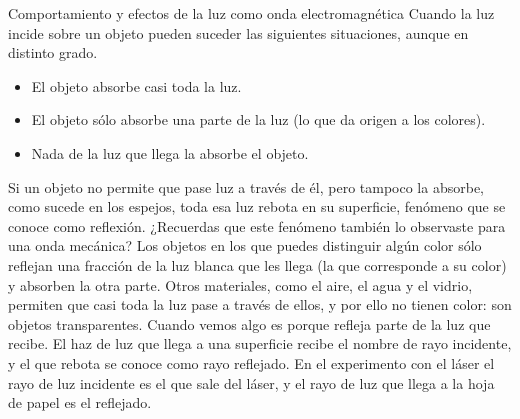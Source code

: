 \documentclass[12pt,addpoints,answers]{guia}
\begin{document}
\begin{questions}
\begin{sectionbox}{Comportamiento y efectos de la luz como onda electromagnética}
        Cuando la luz incide sobre un objeto pueden suceder las siguientes situaciones, aunque
        en distinto grado.

        \begin{itemize}
            \item El objeto absorbe casi toda la luz.
            \item El objeto sólo absorbe una parte de la luz (lo que da origen a los colores).
            \item Nada de la luz que llega la absorbe el objeto.
        \end{itemize}

        Si un objeto no permite que pase luz a través de él, pero tampoco la absorbe, como sucede en los espejos, toda esa luz rebota en su superficie, fenómeno que se conoce
        como reflexión. ¿Recuerdas que este fenómeno también lo observaste para una onda mecánica? Los objetos en los que puedes distinguir algún color sólo reflejan una fracción de
        la luz blanca que les llega (la que corresponde a su color) y absorben la otra parte. Otros materiales, como el aire, el agua y el vidrio, permiten que casi toda la luz pase a través de ellos, y por ello no tienen color:
        son objetos transparentes. Cuando vemos algo es porque refleja
        parte de la luz que recibe. El haz de luz que llega a una
        superficie recibe el nombre de rayo incidente, y el que rebota se conoce como rayo reflejado. En el experimento con
        el láser el rayo de luz incidente es el que sale del láser, y el rayo de luz que llega a la hoja de papel es el reflejado.


\end{sectionbox}
\end{questions}
\end{document}
